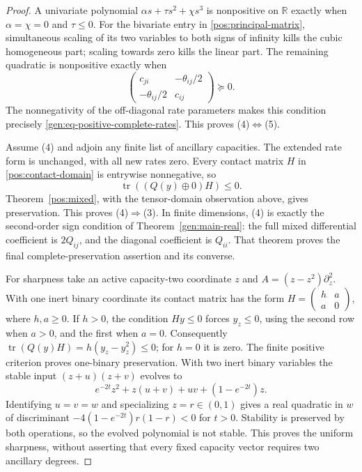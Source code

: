 \documentclass[reqno]{amsart}
\theoremstyle{definition}
\theoremstyle{remark}
\newcommand{\R}{\mathbb R}
\begin{document}
\begin{proof}
A univariate polynomial \(\alpha s+\tau s^2+\chi s^3\) is nonpositive
on \(\R\) exactly when \(\alpha=\chi=0\) and \(\tau\leq0\).
For the bivariate entry in \eqref{pos:principal-matrix}, simultaneous
scaling of its two variables to both signs of infinity kills the cubic
homogeneous part; scaling towards zero kills the linear part.  The remaining
quadratic is nonpositive exactly when
\[
 \begin{pmatrix}c_{ji}&-\theta_{ij}/2\\
                 -\theta_{ij}/2&c_{ij}\end{pmatrix}\succeq0.
\]
The nonnegativity of the off-diagonal rate parameters makes this condition
precisely \eqref{gen:eq-positive-complete-rates}.  This proves (4)$\Leftrightarrow$(5).

Assume (4) and adjoin any finite list of ancillary capacities.  The
extended rate form is unchanged, with all new rates zero.  Every contact
matrix \(H\) in \eqref{pos:contact-domain} is entrywise nonnegative, so
\[
 \operatorname{tr}((Q(y)\oplus0)H)\leq0.
\]
Theorem~\ref{pos:mixed}, with the tensor-domain observation above, gives
preservation.  This proves (4)$\Rightarrow$(3).
In finite dimensions, (4) is exactly the second-order sign condition of
Theorem~\ref{gen:main-real}: the full mixed differential coefficient is
\(2Q_{ij}\), and the diagonal coefficient is \(Q_{ii}\).
That theorem proves the final complete-preservation assertion and its converse.

For sharpness take an active capacity-two coordinate \(z\) and
\(A=(z-z^2)\partial_z^2\).  With one inert binary coordinate its contact
matrix has the form \(H=\left(\begin{smallmatrix}h&a\\a&0\end{smallmatrix}\right)\),
where \(h,a\geq0\).  If \(h>0\), the condition \(Hy\leq0\) forces
\(y_z\leq0\), using the second row when \(a>0\), and the first when
\(a=0\).  Consequently
\(\operatorname{tr}(Q(y)H)=h(y_z-y_z^2)\leq0\); for \(h=0\) it is zero.
The finite positive criterion proves one-binary preservation.
With two inert binary variables the stable input \((z+u)(z+v)\) evolves to
\[
 e^{-2t}z^2+z(u+v)+uv+(1-e^{-2t})z.
\]
Identifying \(u=v=w\) and specializing \(z=r\in(0,1)\) gives a real
quadratic in \(w\) of discriminant
\(-4(1-e^{-2t})r(1-r)<0\) for \(t>0\).  Stability is preserved by both
operations, so the evolved polynomial is not stable.  This proves the
uniform sharpness, without asserting that every fixed capacity vector
requires two ancillary degrees.
\end{proof}
\end{document}
